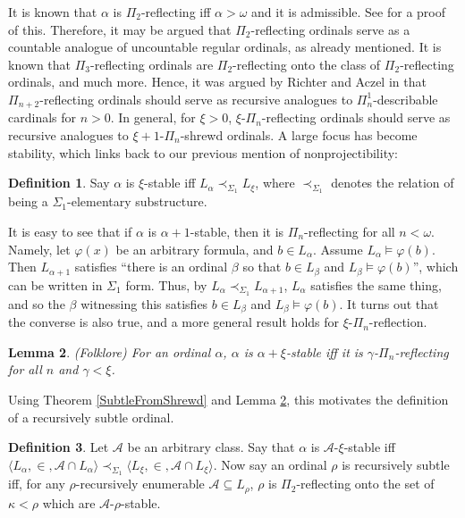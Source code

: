 \documentclass{article}
\theoremstyle{definition}
\newtheorem{definition}{Definition}[section]
\theoremstyle{plain}
\theoremstyle{plain}
\theoremstyle{plain}
\theoremstyle{plain}
\theoremstyle{remark}
\theoremstyle{remark}
\theoremstyle{remark}
\theoremstyle{plain}
\newtheorem{lemma}[definition]{Lemma}
\theoremstyle{plain}
\theoremstyle{plain}
\begin{document}
It is known that $\alpha$ is $\Pi_2$-reflecting iff $\alpha > \omega$ and it is admissible. See \cite{arai} for a proof of this. Therefore, it may be argued that $\Pi_2$-reflecting ordinals serve as a countable analogue of uncountable regular ordinals, as already mentioned. It is known that $\Pi_3$-reflecting ordinals are $\Pi_2$-reflecting onto the class of $\Pi_2$-reflecting ordinals, and much more. Hence, it was argued by Richter and Aczel in \cite{richter} that $\Pi_{n+2}$-reflecting ordinals should serve as recursive analogues to $\Pi^1_n$-describable cardinals for $n > 0$. In general, for $\xi > 0$, $\xi$-$\Pi_n$-reflecting ordinals should serve as recursive analogues to $\xi+1$-$\Pi_n$-shrewd ordinals. A large focus has become stability, which links back to our previous mention of nonprojectibility:

\begin{definition}
\label{StableOrdinal}
Say $\alpha$ is $\xi$-stable iff $L_\alpha \prec_{\Sigma_1} L_\xi$, where $\prec_{\Sigma_1}$ denotes the relation of being a $\Sigma_1$-elementary substructure.
\end{definition}

It is easy to see that if $\alpha$ is $\alpha+1$-stable, then it is $\Pi_n$-reflecting for all $n < \omega$. Namely, let $\varphi(x)$ be an arbitrary formula, and $b \in L_\alpha$. Assume $L_\alpha \models \varphi(b)$. Then $L_{\alpha+1}$ satisfies ``there is an ordinal $\beta$ so that $b \in L_\beta$ and $L_\beta \models \varphi(b)$'', which can be written in $\Sigma_1$ form. Thus, by $L_\alpha \prec_{\Sigma_1} L_{\alpha+1}$, $L_\alpha$ satisfies the same thing, and so the $\beta$ witnessing this satisfies $b \in L_\beta$ and $L_\beta \models \varphi(b)$. It turns out that the converse is also true, and a more general result holds for $\xi$-$\Pi_n$-reflection.

\begin{lemma}
\label{StableVersusReflecting}
(Folklore) For an ordinal $\alpha$, $\alpha$ is $\alpha+\xi$-stable iff it is $\gamma$-$\Pi_n$-reflecting for all $n$ and $\gamma < \xi$.
\end{lemma}

Using Theorem \ref{SubtleFromShrewd} and Lemma \ref{StableVersusReflecting}, this motivates the definition of a recursively subtle ordinal.

\begin{definition}
Let $\mathcal{A}$ be an arbitrary class. Say that $\alpha$ is $\mathcal{A}$-$\xi$-stable iff $\langle L_\alpha, \in, \mathcal{A} \cap L_\alpha \rangle \prec_{\Sigma_1} \langle L_\xi, \in, \mathcal{A} \cap L_\xi \rangle$. Now say an ordinal $\rho$ is recursively subtle iff, for any $\rho$-recursively enumerable $\mathcal{A} \subseteq L_\rho$, $\rho$ is $\Pi_2$-reflecting onto the set of $\kappa < \rho$ which are $\mathcal{A}$-$\rho$-stable.
\end{definition}
\end{document}
